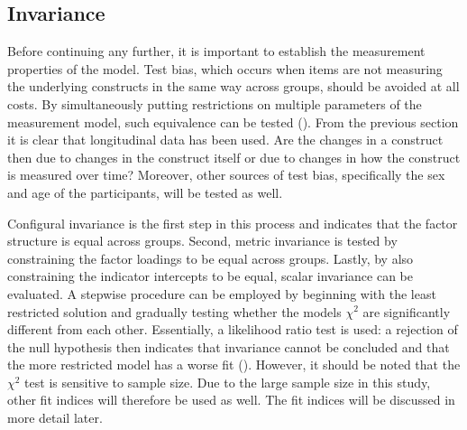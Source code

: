 \documentclass[11pt]{article}
\begin{document}

\subsection{Invariance}


Before continuing any further, it is important to establish the measurement
properties of the model. Test bias, which occurs when items are not measuring
the underlying constructs in the same way across groups, should be avoided at
all costs. By simultaneously putting restrictions on multiple parameters of the
measurement model, such equivalence can be tested (\cite{brown2015}). From the
previous section it is clear that longitudinal data has been used. Are the changes
in a construct then due to changes in the construct itself or due to changes in
how the construct is measured over time? Moreover, other sources of test bias,
specifically the sex and age of the participants, will be tested as well.

Configural invariance is the first step in this process and indicates that the
factor structure is equal across groups. Second, metric invariance is tested by
constraining the factor loadings to be equal across groups. Lastly, by also
constraining the indicator intercepts to be equal, scalar invariance can be
evaluated. A stepwise procedure can be employed by beginning with the least
restricted solution and gradually testing whether the models $\chi^2$ are
significantly different from each other. Essentially, a likelihood ratio test is
used: a rejection of the null hypothesis then indicates that invariance cannot
be concluded and that the more restricted model has a worse fit (\cite{brown2015}).
However, it should be noted that the $\chi^2$ test is sensitive to sample size.
Due to the large sample size in this study, other fit indices will therefore be
used as well. The fit indices will be discussed in more detail later.
\end{document}
